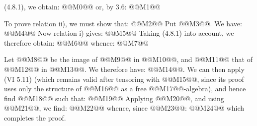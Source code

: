 (4.8.1), we obtain:
@@M0@@
or, by 3.6:
@@M1@@

To prove relation ii), we must show that:
@@M2@@
Put @@M3@@. We have:
@@M4@@
Now relation i) gives:
@@M5@@
Taking (4.8.1) into account, we therefore obtain:
@@M6@@
whence:
@@M7@@

Let @@M8@@ be the image of @@M9@@ in @@M10@@, and @@M11@@ that of @@M12@@ in @@M13@@. We therefore have: @@M14@@. We can then apply (VI 5.11) (which remains valid after tensoring with @@M15@@, since its proof uses only the structure of @@M16@@ as a free @@M17@@-algebra), and hence find @@M18@@ such that:
@@M19@@
Applying @@M20@@, and using @@M21@@, we find:
@@M22@@
whence, since @@M23@@:
@@M24@@
which completes the proof.
